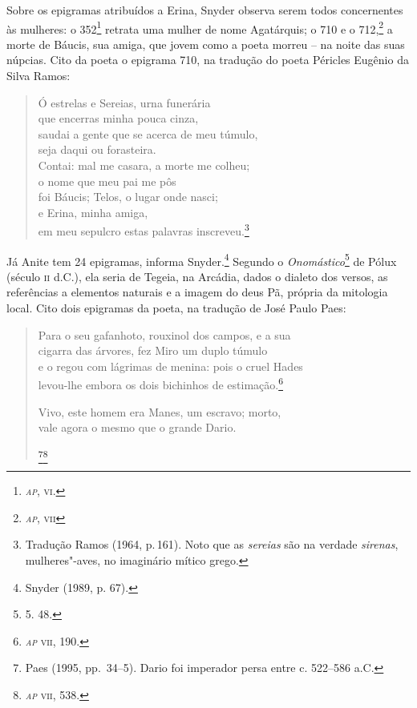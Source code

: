 Sobre os epigramas atribuídos a Erina, Snyder observa
serem todos concernentes às mulheres: o 352\footnote{\textit{\textsc{ap}}, \textsc{vi}.}
retrata uma mulher de nome Agatárquis; o 710 e o 712,\footnote{\textit{\textsc{ap}}, \textsc{vii}} a morte de 
Báucis, sua amiga, que jovem como a poeta morreu -- na noite das suas núpcias.
Cito da poeta o epigrama 710, na tradução do poeta Péricles Eugênio da Silva Ramos:

\begin{verse}
\small{Ó estrelas e Sereias, urna funerária\\ 
\quad que encerras minha pouca cinza,\\
saudai a gente que se acerca de meu túmulo,\\
\quad seja daqui ou forasteira.\\
Contai: mal me casara, a morte me colheu;\\
\quad o nome que meu pai me pôs\\
foi Báucis; Telos, o lugar onde nasci;\\
\quad e Erina, minha amiga,\\
em meu sepulcro estas palavras inscreveu.}\footnote{Tradução Ramos (1964, p.\,161). Noto que as \textit{sereias} são na verdade \textit{sirenas}, mulheres"-aves, no imaginário mítico grego.}
\end{verse}

Já Anite tem 24 
epigramas, informa Snyder.\footnote{ Snyder (1989, p. 67).} Segundo o \textit{Onomástico}\footnote{5. 48.} de
Pólux (século \textsc{ii} d.C.), ela seria de Tegeia, na Arcádia, dados o dialeto dos
versos, as referências a elementos naturais e a imagem do deus Pã, própria da
mitologia local. Cito dois epigramas da poeta, na tradução de José Paulo Paes:

\begin{verse}
\small{Para o seu gafanhoto, rouxinol dos campos, e a sua\\
cigarra das árvores, fez Miro um duplo túmulo\\
e o regou com lágrimas de menina: pois o cruel Hades\\
levou-lhe embora os dois bichinhos de estimação.\footnote{\textit{\textsc{ap}} \textsc{vii}, 190.}

Vivo, este homem era Manes, um escravo; morto,\\
vale agora o mesmo que o grande Dario.}\footnote{Paes (1995, pp.~34--5). Dario foi imperador persa entre c. 522--586 a.C.}\footnote{\textit{\textsc{ap}} \textsc{vii}, 538.}
\end{verse}

